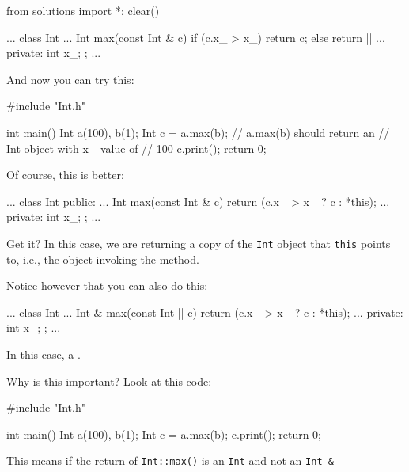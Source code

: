 \begin{python0}
from solutions import *; clear()
\end{python0}

\begin{consolethree}[escapeinside=||]
...
class Int
{
    ...
    Int max(const Int & c)
    {
        if (c.x_ > x_)
            return c;
        else
            return ||
    }
    ...
private:
    int x_;
};
...
\end{consolethree}

And now you can try this:

\begin{consolethree}[escapeinside=||]
#include "Int.h"

int main()
{
    Int a(100), b(1);
    Int c = a.max(b); // a.max(b) should return an
                      // Int object with x_ value of
                      // 100
    c.print();
    return 0;
}
\end{consolethree}

Of course, this is better:

\begin{consolethree}[escapeinside=||]
...
class Int
{
public:
    ...
    Int max(const Int & c)
    {
        return (c.x_ > x_ ? c : *this);
    }
    ...
private:
    int x_;
};
...
\end{consolethree}

Get it? In this case, we are returning a copy of the \texttt{Int} object
that \texttt{this} points to, i.e., the object invoking the method.

Notice however that you can also do this:

\begin{consolethree}[escapeinside=||]
...
class Int
{
    ...
    Int & max(const Int |\EMPHASIZE{\&}| c)
    {
        return (c.x_ > x_ ? c : *this);
    }
    ...
private:
    int x_;
};
...
\end{consolethree}

In this case, a .

Why is this important? Look at this code:

\begin{consolethree}[escapeinside=||]
#include "Int.h"

int main()
{
    Int a(100), b(1);
    Int c = a.max(b);
    c.print();
    return 0;
}
\end{consolethree}

This means if the return of \texttt{Int::max()} is an \texttt{Int} and not
an \texttt{Int \&}

